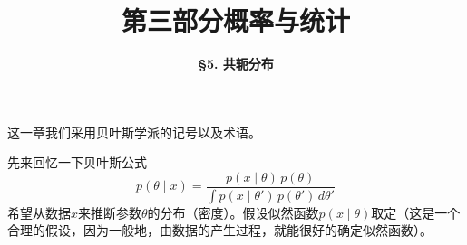 \documentclass[10pt]{beamer}
\title[Probability \& Statistics]{\LARGE \bfseries 第三部分\quad 概率与统计} %
\author[Conjugate Distributions] %
{\Large \bfseries \S 5. 共轭分布}
\date{}
\begin{document}

\begin{frame}

\titlepage %

\end{frame}






\begin{frame}

这一章我们采用贝叶斯学派的记号以及术语。

\vspace{0.5em}

先来回忆一下贝叶斯公式
$$p(\theta \mid x)={\dfrac{p(x \mid \theta)\, p(\theta)}{ \int p(x \mid \theta')\,p(\theta')\,d\theta '}}$$
希望从数据$x$来推断参数$\theta$的分布（密度）。假设似然函数$p(x \mid \theta)$取定（这是一个合理的假设，因为一般地，由数据的产生过程，就能很好的确定似然函数）。

\end{frame}

\end{document}
